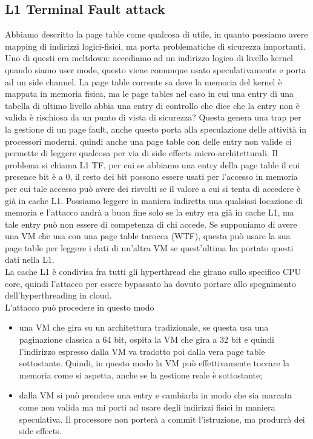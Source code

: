 \documentclass[12pt, oneside]{extbook}
\begin{document}
\subsection{L1 Terminal Fault attack}
Abbiamo descritto la page table come qualcosa di utile, in quanto possiamo avere mapping di indirizzi logici-fisici, ma porta problematiche di sicurezza importanti. Uno di questi era meltdown: accediamo ad un indirizzo logico di livello kernel quando siamo user mode, questo viene comunque usato speculativamente e porta ad un side channel. La page table corrente sa dove la memoria del kernel è mappata in memoria fisica, ma le page tables nel caso in cui una entry di una tabella di ultimo livello abbia una entry di controllo che dice che la entry non è valida è rischiosa da un punto di vista di sicurezza? Questa genera una trap per la gestione di un page fault, anche questo porta alla speculazione delle attività in processori moderni, quindi anche una page table con delle entry non valide ci permette di leggere qualcosa per via di side effects micro-architetturali. Il problema si chiama L1 TF, per cui se abbiamo una entry della page table il cui presence bit è a 0, il resto dei bit possono essere usati per l'accesso in memoria per cui tale accesso può avere dei risvolti se il valore a cui si tenta di accedere è già in cache L1. Possiamo leggere in maniera indiretta una qualsiasi locazione di memoria e l'attacco andrà a buon fine solo se la entry era già in cache L1, ma tale entry può non essere di competenza di chi accede. Se supponiamo di avere una VM che usa con una page table tarocca (WTF), questa può usare la sua page table per leggere i dati di un'altra VM se quest'ultima ha portato questi dati nella L1.\\ La cache L1 è condivisa fra tutti gli hyperthread che girano sullo specifico CPU core, quindi l'attacco per essere bypassato ha dovuto portare allo spegnimento dell'hyperthreading in cloud.\\ L'attacco può procedere in questo modo
\begin{itemize}
\item una VM che gira su un architettura tradizionale, se questa usa una paginazione classica a 64 bit, ospita la VM che gira a 32 bit e quindi l'indirizzo espresso dalla VM va tradotto poi dalla vera page table sottostante. Quindi, in questo modo la VM può effettivamente toccare la memoria come si aspetta, anche se la gestione reale è sottostante;
\item dalla VM si può prendere una entry e cambiarla in modo che sia marcata come non valida ma mi porti ad usare degli indirizzi fisici in maniera speculativa. Il processore non porterà a commit l'istruzione, ma produrrà dei side effects.
\end{itemize}
\end{document}
